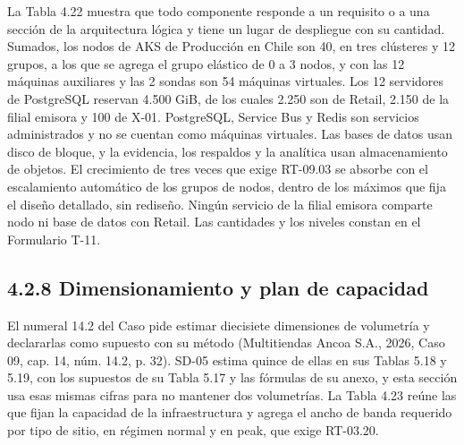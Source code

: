 \documentclass[11pt]{article}
\begin{document}
La Tabla 4.22 muestra que todo componente responde a un requisito o a una sección de la arquitectura lógica y tiene un lugar de despliegue con su cantidad. Sumados, los nodos de AKS de Producción en Chile son 40, en tres clústeres y 12 grupos, a los que se agrega el grupo elástico de 0 a 3 nodos, y con las 12 máquinas auxiliares y las 2 sondas son 54 máquinas virtuales. Los 12 servidores de PostgreSQL reservan 4.500 GiB, de los cuales 2.250 son de Retail, 2.150 de la filial emisora y 100 de X-01. PostgreSQL, Service Bus y Redis son servicios administrados y no se cuentan como máquinas virtuales. Las bases de datos usan disco de bloque, y la evidencia, los respaldos y la analítica usan almacenamiento de objetos. El crecimiento de tres veces que exige RT-09.03 se absorbe con el escalamiento automático de los grupos de nodos, dentro de los máximos que fija el diseño detallado, sin rediseño. Ningún servicio de la filial emisora comparte nodo ni base de datos con Retail. Las cantidades y los niveles constan en el Formulario T-11.

\subsection{4.2.8 Dimensionamiento y plan de capacidad}

El numeral 14.2 del Caso pide estimar diecisiete dimensiones de volumetría y declararlas como supuesto con su método (Multitiendas Ancoa S.A., 2026, Caso 09, cap. 14, núm. 14.2, p. 32). SD-05 estima quince de ellas en sus Tablas 5.18 y 5.19, con los supuestos de su Tabla 5.17 y las fórmulas de su anexo, y esta sección usa esas mismas cifras para no mantener dos volumetrías. La Tabla 4.23 reúne las que fijan la capacidad de la infraestructura y agrega el ancho de banda requerido por tipo de sitio, en régimen normal y en peak, que exige RT-03.20.

\par\vspace{0pt plus 10\baselineskip}\vspace{0pt plus -10\baselineskip}
\end{document}
